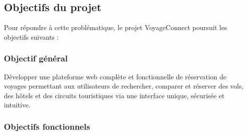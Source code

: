\documentclass[12pt,a4paper]{report}
\begin{document}
\subsection{Objectifs du projet}

Pour répondre à cette problématique, le projet VoyageConnect poursuit les objectifs suivants :

\subsubsection{Objectif général}

Développer une plateforme web complète et fonctionnelle de réservation de voyages permettant aux utilisateurs de rechercher, comparer et réserver des vols, des hôtels et des circuits touristiques via une interface unique, sécurisée et intuitive.

\subsubsection{Objectifs fonctionnels}
\end{document}
